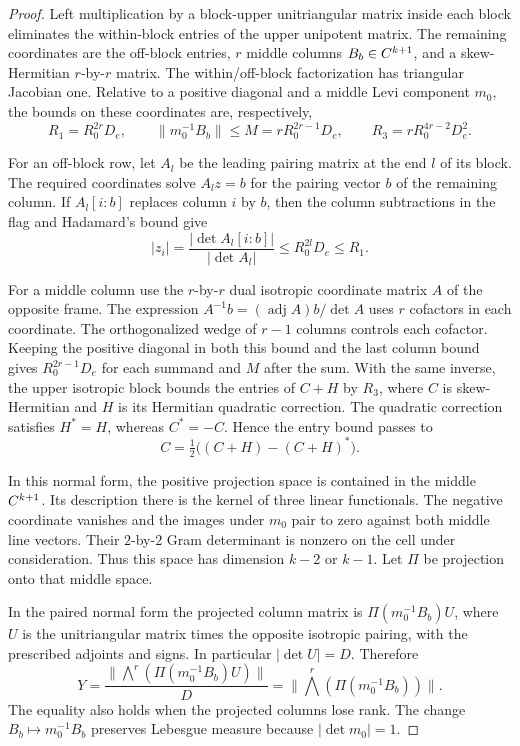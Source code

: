 \begin{proof}
Left multiplication by a block-upper unitriangular matrix inside
each block eliminates the within-block entries of the upper
unipotent matrix. The remaining coordinates are the off-block
entries, \(r\) middle columns \(B_b\in C^{k+1}\), and a
skew-Hermitian \(r\)-by-\(r\) matrix. The within/off-block
factorization has triangular Jacobian one. Relative to a
positive diagonal and a middle Levi component \(m_0\),
the bounds on these coordinates are, respectively,
\[
 R_1=R_0^{2r}D_e,\qquad
 \|m_0^{-1} B_b\|\le M=rR_0^{2r-1}D_e,\qquad
 R_3=rR_0^{4r-2}D_e^2.
\]


For an off-block row, let \(A_l\) be the leading pairing
matrix at the end \(l\) of its block. The required coordinates
solve \(A_l z=b\) for the pairing vector \(b\) of the remaining
column. If \(A_l[i:b]\) replaces column \(i\) by \(b\), then
the column subtractions in the flag and Hadamard's bound give
\[
 |z_i|=\frac{|\det A_l[i:b]|}{|\det A_l|}
           \le R_0^{2l}D_e\le R_1 .
\]

For a middle column use the \(r\)-by-\(r\) dual isotropic
coordinate matrix \(A\) of the opposite frame.
The expression \(A^{-1}b=(\operatorname{adj}A)b/\det A\)
uses \(r\) cofactors in each coordinate. The orthogonalized
wedge of \(r-1\) columns controls each cofactor. Keeping the
positive diagonal in both this bound and the last column
bound gives \(R_0^{2r-1}D_e\) for each summand and \(M\) after
the sum. With the same inverse, the upper isotropic block
bounds the entries of \(C+H\) by \(R_3\), where \(C\) is
skew-Hermitian and \(H\) is its Hermitian quadratic correction.
The quadratic correction satisfies \(H^*=H\), whereas \(C^*=-C\).
Hence the entry bound passes to
\[
        C=\tfrac12\bigl((C+H)-(C+H)^*\bigr).
\]
\label{cor:absolute-amplitude-2}

In this normal form, the positive projection space is contained
in the middle \(C^{k+1}\). Its description there is the kernel
of three linear functionals. The negative coordinate vanishes
and the images under \(m_0\) pair to zero against both middle
line vectors. Their \(2\)-by-\(2\) Gram determinant is nonzero
on the cell under consideration. Thus this space has dimension
\(k-2\) or \(k-1\). Let \(\Pi\) be projection onto that middle space.

In the paired
normal form the projected column matrix is
\(\Pi(m_0^{-1}B_b)U\), where \(U\) is the unitriangular
matrix times the opposite isotropic pairing, with the prescribed
adjoints and signs. In particular \(|\det U|=D\). Therefore
\[
  Y=\frac{\|\bigwedge^r(\Pi(m_0^{-1}B_b)U)\|}{D}
    =\|\bigwedge^r(\Pi(m_0^{-1}B_b))\|.
\]
The equality also holds when the projected columns lose rank. The change
\(B_b\mapsto m_0^{-1}B_b\) preserves Lebesgue measure because
\(|\det m_0|=1\).


\end{proof}
